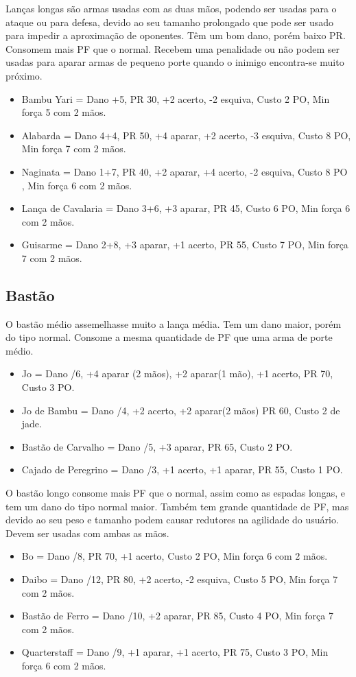 Lanças longas são armas usadas com as duas mãos, podendo ser usadas para o ataque ou para defesa, devido ao seu tamanho prolongado que pode ser usado para impedir a aproximação de oponentes. Têm um bom dano, porém baixo PR. Consomem mais PF que o normal. Recebem uma penalidade ou não podem ser usadas para aparar armas de pequeno porte quando o inimigo encontra-se muito próximo.

\begin{itemize}	
	\item Bambu Yari = Dano +5, PR 30, +2 acerto, -2 esquiva, Custo 2 PO, Min força 5 com 2 mãos.
	\item Alabarda = Dano 4+4, PR 50, +4 aparar, +2 acerto, -3 esquiva, Custo 8 PO, Min força 7 com 2 mãos.
	\item Naginata = Dano 1+7, PR 40, +2 aparar, +4 acerto, -2 esquiva, Custo 8 PO , Min força 6 com 2 mãos.
	\item Lança de Cavalaria = Dano 3+6, +3 aparar, PR 45, Custo 6 PO, Min força 6 com 2 mãos.
	\item Guisarme = Dano 2+8, +3 aparar, +1 acerto, PR 55, Custo 7 PO, Min força 7 com 2 mãos.
\end{itemize}	


\subsection{Bastão}
O bastão médio assemelhasse muito a lança média. Tem um dano maior, porém do tipo normal. Consome a mesma quantidade de PF que uma arma de porte médio.

\begin{itemize}	
	\item Jo = Dano /6, +4 aparar (2 mãos), +2 aparar(1 mão), +1 acerto,  PR 70, Custo 3 PO.
	\item Jo de Bambu = Dano /4, +2 acerto, +2 aparar(2 mãos)  PR 60, Custo 2 de jade.
	\item Bastão de Carvalho = Dano /5, +3 aparar, PR 65, Custo 2 PO.
	\item Cajado de Peregrino = Dano /3, +1 acerto, +1 aparar, PR 55, Custo 1 PO.
\end{itemize}	

O bastão longo consome mais PF que o normal, assim como as espadas longas, e tem um dano do tipo normal maior. Também tem grande quantidade de PF, mas devido ao seu peso e tamanho podem causar redutores na agilidade do usuário. Devem ser usadas com ambas as mãos.

\begin{itemize}	
	\item Bo = Dano /8, PR 70, +1 acerto, Custo 2 PO, Min força 6 com 2 mãos.	
	\item Daibo = Dano /12, PR 80, +2 acerto, -2 esquiva, Custo 5 PO, Min força 7 com 2 mãos.	
	\item Bastão de Ferro = Dano /10, +2 aparar, PR 85, Custo 4 PO, Min força 7 com 2 mãos.
	\item Quarterstaff = Dano /9, +1 aparar, +1 acerto, PR 75, Custo 3 PO, Min força 6 com 2 mãos.
\end{itemize}	



